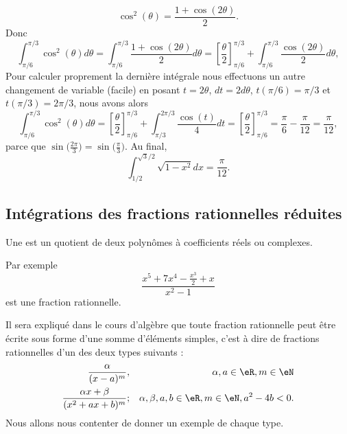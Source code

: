 \begin{example}
    \begin{equation}
        \cos^2(\theta)=\frac{ 1+\cos(2\theta) }{ 2 }.
    \end{equation}
    Donc
    \begin{equation}
        \int_{\pi/6}^{\pi/3}\cos^2(\theta)d\theta=\int_{\pi/6}^{\pi/3}\frac{ 1+\cos(2\theta) }{2}d\theta=\left[ \frac{ \theta }{2}\right]_{\pi/6}^{\pi/3}+\int_{\pi/6}^{\pi/3}\frac{ \cos(2\theta) }{2}d\theta, 
    \end{equation}
    Pour calculer proprement la dernière intégrale nous effectuons un autre changement de variable (facile) en posant $t = 2\theta$, $dt = 2 d\theta$, $t(\pi/6) = \pi/3$ et $t(\pi/3) = 2\pi/3$, nous avons alors 
    \begin{equation}
        \int_{\pi/6}^{\pi/3}\cos^2(\theta)d\theta=\left[ \frac{ \theta }{2}\right]_{\pi/6}^{\pi/3}+\int_{\pi/3}^{2\pi/3}\frac{ \cos(t) }{4}dt  = \left[ \frac{ \theta }{2}\right]_{\pi/6}^{\pi/3}=\frac{ \pi }{ 6 }-\frac{ \pi }{ 12 }=\frac{ \pi }{ 12 }, 
    \end{equation}
    parce que \( \sin\big( \frac{ 2\pi }{ 3 } \big)=\sin\big( \frac{ \pi }{ 3 } \big)\). Au final,
    \begin{equation}
        \int_{1/2}^{\sqrt{3}/2}\sqrt{1-x^2}dx=\frac{ \pi }{ 12 }.
    \end{equation}
\end{example}

\subsection{Intégrations des fractions rationnelles réduites}

\begin{definition}
    Une  est un quotient de deux polynômes à coefficients réels ou complexes.
\end{definition}
Par exemple
\begin{equation}
    \frac{ x^5+7x^4-\frac{ x^3 }{2}+x }{ x^2-1 }
\end{equation}
est une fraction rationnelle.

Il sera expliqué dans le cours d'algèbre que toute fraction rationnelle peut être écrite sous forme d'une somme d'éléments simples, c'est à dire de fractions rationnelles d'un des deux types suivants :
\begin{subequations}
    \begin{align}
        \frac{ \alpha }{ (x-a)^m },&& \alpha,a\in \eR,m\in \eN  \label{CasMMIooZnZpUWi}\\
        \frac{ \alpha x+\beta }{ (x^2+ax+b)^m };&&\alpha, \beta ,a,b\in \eR,m\in \eN,a^2-4b<0. \label{CasMMIooZnZpUWii}
    \end{align}
\end{subequations}
Nous allons nous contenter de donner un exemple de chaque type.

